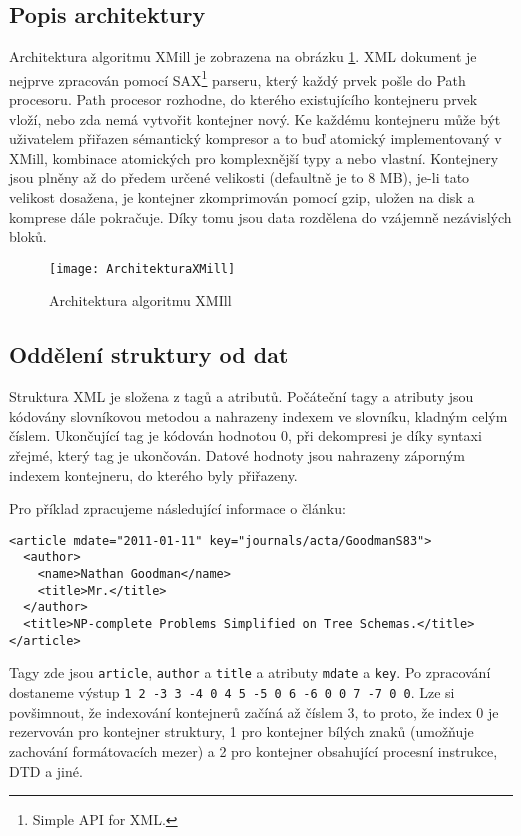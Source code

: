 \subsection{Popis architektury}
Architektura algoritmu XMill je zobrazena na obrázku \ref{architekturaXMill}. XML dokument je nejprve zpracován pomocí SAX\footnote{Simple API for XML.} parseru, který každý prvek pošle do Path procesoru. Path procesor rozhodne, do kterého existujícího kontejneru prvek vloží, nebo zda nemá vytvořit kontejner nový. Ke každému kontejneru může být uživatelem přiřazen sémantický kompresor a to buď atomický implementovaný v XMill, kombinace atomických pro komplexnější typy a nebo vlastní. Kontejnery jsou plněny až do předem určené velikosti (defaultně je to 8 MB), je-li tato velikost dosažena, je kontejner zkomprimován pomocí gzip, uložen na disk a komprese dále pokračuje. Díky tomu jsou data rozdělena do vzájemně nezávislých bloků.

\begin{figure}[!htb]
\centering
\texttt{[image: ArchitekturaXMill]}
\caption{Architektura algoritmu XMIll \cite{xmill}}
\label{architekturaXMill}
\end{figure}

\subsection{Oddělení struktury od dat}
\label{xmillOddeleniStruktury}
Struktura XML je složena z tagů a atributů. Počáteční tagy a atributy jsou kódovány slovníkovou metodou a nahrazeny indexem ve slovníku, kladným celým číslem. Ukončující tag je kódován hodnotou 0, při dekompresi je díky syntaxi zřejmé, který tag je ukončován. Datové hodnoty jsou nahrazeny záporným indexem kontejneru, do kterého byly přiřazeny.\cite{xmill}

Pro příklad zpracujeme následující informace o článku:

\begin{verbatim}
<article mdate="2011-01-11" key="journals/acta/GoodmanS83">
  <author>
    <name>Nathan Goodman</name>
    <title>Mr.</title>
  </author>
  <title>NP-complete Problems Simplified on Tree Schemas.</title>
</article>
\end{verbatim}

Tagy zde jsou \texttt{article}, \texttt{author} a \texttt{title} a atributy \texttt{mdate} a \texttt{key}. Po zpracování dostaneme výstup \texttt{1 2 -3 3 -4 0 4 5 -5 0 6 -6 0 0 7 -7 0 0}. Lze si povšimnout, že indexování kontejnerů začíná až číslem 3, to proto, že index 0 je rezervován pro kontejner struktury, 1 pro kontejner bílých znaků (umožňuje zachování formátovacích mezer) a 2 pro kontejner obsahující procesní instrukce, DTD a jiné.

